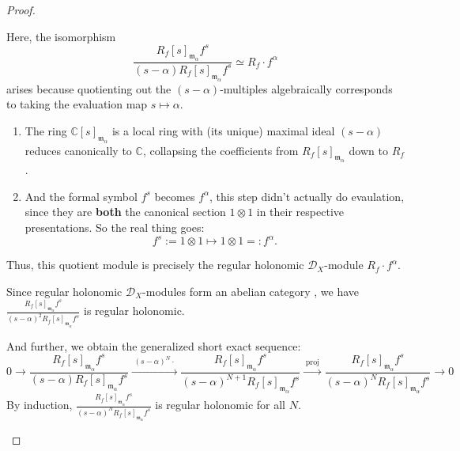 \begin{proof}
\begin{enumerate}
              Here, the isomorphism
              \[
                  \frac{R_f[s]_{\mathfrak{m}_{\alpha}} f^{s}}{(s-\alpha) R_f[s]_{\mathfrak{m}_{\alpha}} f^{s}} \simeq R_{f} \cdot f^{\alpha}
              \]
              arises because quotienting out the $(s-\alpha)$-multiples algebraically corresponds to taking the evaluation map $s \mapsto \alpha$.
              \begin{enumerate}
                  \item The ring $\mathbb{C}[s]_{\mathfrak{m}_{\alpha}}$ is a local ring with (its unique) maximal ideal $(s-\alpha)$ reduces canonically to $\mathbb{C}$, collapsing the coefficients from $R_f[s]_{\mathfrak{m}_{\alpha}}$ down to $R_{f}$.
                  \item And the formal symbol $f^{s}$ becomes $f^{\alpha}$, this step didn't actually do evaulation, since they are \textbf{both} the canonical section $1\otimes 1$ in their respective presentations. So the real thing goes:
                        \[
                            f^s:=1\otimes 1 \mapsto 1\otimes 1=:f^\alpha.
                        \]
              \end{enumerate}
              Thus, this quotient module is precisely the regular holonomic $\mathcal{D}_X$-module $R_{f} \cdot f^{\alpha}$.

              Since regular holonomic $\mathcal{D}_{X}$-modules form an abelian category \cite[Combine Prop.~3.1.2 and Def.~6.1.1]{hotta2008d}, we have $\frac{R_{f}[s]_{\mathfrak{m}_{\alpha}}f^{s}}{(s-\alpha)^{2}R_{f}[s]_{\mathfrak{m}_{\alpha}}f^{s}}$ is regular holonomic.

              And further, we obtain the generalized short exact sequence:
              \[
                  0 \longrightarrow \frac{R_f[s]_{\mathfrak{m}_{\alpha}} f^{s}}{(s-\alpha) R_f[s]_{\mathfrak{m}_{\alpha}} f^{s}} \xrightarrow{\;(s-\alpha)^N\cdot\;} \frac{R_f[s]_{\mathfrak{m}_{\alpha}} f^{s}}{(s-\alpha)^{N+1} R_f[s]_{\mathfrak{m}_{\alpha}} f^{s}} \xrightarrow{\;\text{proj}\;} \frac{R_f[s]_{\mathfrak{m}_{\alpha}} f^{s}}{(s-\alpha)^N R_f[s]_{\mathfrak{m}_{\alpha}} f^{s}} \longrightarrow 0
              \]
              By induction, $\frac{R_f[s]_{\mathfrak{m}_{\alpha}} f^{s}}{(s-\alpha)^{N} R_f[s]_{\mathfrak{m}_{\alpha}} f^{s}}$ is regular holonomic for all $N$.


\end{enumerate}
\end{proof}
